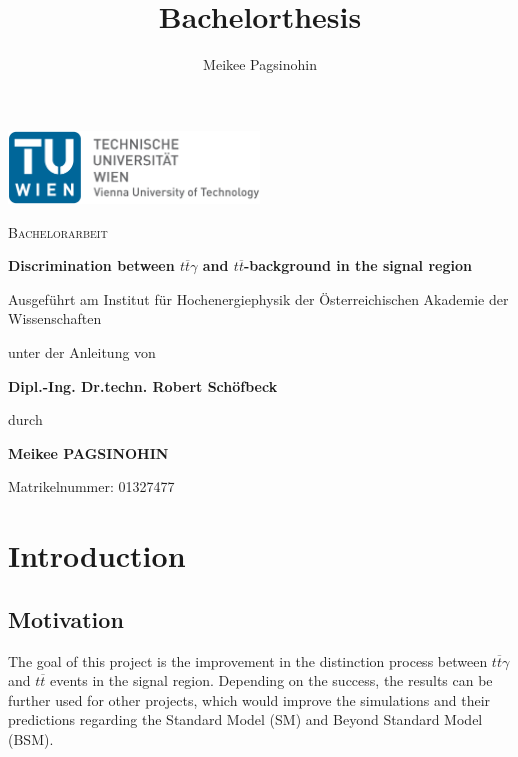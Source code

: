 \documentclass[11pt]{scrartcl}
\title{Bachelorthesis}
\author{Meikee Pagsinohin}
\begin{document}
\begin{titlepage}
	\centering
	\includegraphics[width=0.5\textwidth]{figures/TU.png}\par\vspace{1cm}
	\vspace{1cm}
	{\scshape\LARGE Bachelorarbeit \par}
	\vspace{1cm}
	{\scshape\Large \par}
	\vspace{1.5cm}
	{\huge\bfseries Discrimination between $t\overline{t}\gamma$ and $t\overline{t}$-background in the signal region \par}
	\vspace{2cm}
	{\Large Ausgeführt am Institut für Hochenergiephysik der Österreichischen Akademie der Wissenschaften \par}
	\vspace{2cm}
	{\Large unter der Anleitung von \par}
	{\Large\bfseries Dipl.-Ing. Dr.techn. Robert Schöfbeck \par}	
	\vspace{2cm}
	{\Large durch \par}	
	{\Large\bfseries Meikee PAGSINOHIN \par}	
	\vfill
	{\Large Matrikelnummer: 01327477 \par}

	\vfill

\end{titlepage}

\tableofcontents
\newpage

\section{Introduction}

	\subsection{Motivation}
		The goal of this project is the improvement in the distinction process between $t\overline{t}\gamma$ and $t\overline{t}$ events in the signal region. Depending on the success, the results can be further used for other projects, which would improve the simulations and their predictions regarding the Standard Model (SM) and Beyond Standard Model (BSM). 
\end{document}

